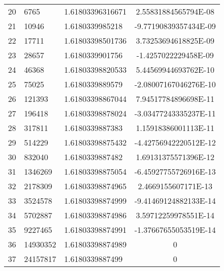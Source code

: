 \begin{longtable}{lllc}
20	&	6765	&	1.61803396316671	&	2.55831884565794E-08	\\
21	&	10946	&	1.6180339985218	&	-9.77190839357434E-09	\\
22	&	17711	&	1.61803398501736	&	3.73253694618825E-09	\\
23	&	28657	&	1.6180339901756	&	-1.4257022229458E-09	\\
24	&	46368	&	1.61803398820533	&	5.44569944693762E-10	\\
25	&	75025	&	1.6180339889579	&	-2.08007167046276E-10	\\
26	&	121393	&	1.61803398867044	&	7.94517784896698E-11	\\
27	&	196418	&	1.61803398878024	&	-3.03477243335237E-11	\\
28	&	317811	&	1.6180339887383	&	1.15918386001113E-11	\\
29	&	514229	&	1.61803398875432	&	-4.42756942220512E-12	\\
30	&	832040	&	1.6180339887482	&	1.69131375571396E-12	\\
31	&	1346269	&	1.61803398875054	&	-6.45927755726916E-13	\\
32	&	2178309	&	1.61803398874965	&	2.4669155607171E-13	\\
33	&	3524578	&	1.61803398874999	&	-9.41469124882133E-14	\\
34	&	5702887	&	1.61803398874986	&	3.59712259978551E-14	\\
35	&	9227465	&	1.61803398874991	&	-1.37667655053519E-14	\\
36	&	14930352	&	1.61803398874989	&	0	\\
37	&	24157817	&	1.6180339887499	&	0	\\
\end{longtable}

